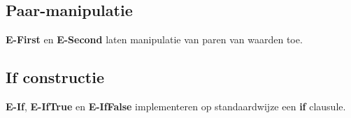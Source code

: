 \subsection{Paar-manipulatie}
\textbf{E-First} en \textbf{E-Second} laten manipulatie van paren van waarden toe.

\subsection{If constructie}
\textbf{E-If}, \textbf{E-IfTrue} en \textbf{E-IfFalse} implementeren op standaardwijze een \textbf{if} clausule.


